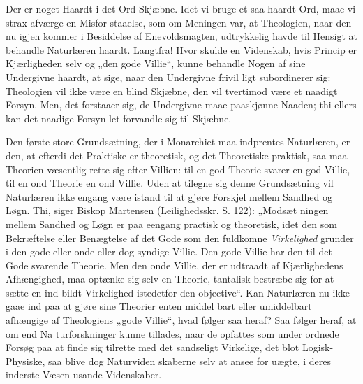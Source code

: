 \documentclass[12pt]{book}
\newcommand{\opage}[1]{\marginnote{\footnotesize\textit{[#1]}}}
\begin{document}
Der er noget Haardt i det Ord Skjæbne. Idet vi
bruge et saa haardt Ord, maae vi strax afværge en Misfor\-%
staaelse, som om Meningen var, at Theologien, naar den nu
igjen kommer i Besiddelse af Enevoldsmagten, udtrykkelig
havde til Hensigt at behandle Naturlæren haardt. Langtfra!
Hvor skulde en Videnskab, hvis Princip er Kjærligheden
selv og „den gode Villie“, kunne behandle Nogen af sine
Undergivne haardt, at sige, naar den Undergivne frivil\-%
ligt subordinerer sig: Theologien vil ikke være en blind
Skjæbne, den vil tvertimod være et naadigt Forsyn. Men,
det forstaaer sig, de Undergivne maae paaskjønne Naaden;
thi ellers kan det naadige Forsyn let forvandle sig til
Skjæbne.

Den første store Grundsætning, der i Monarchiet maa
indprentes Naturlæren, er den, at efterdi det Praktiske er
theoretisk, og det Theoretiske praktisk, saa maa Theorien
væsentlig rette sig efter Villien: til en god Theorie svarer en
god Villie, til en ond Theorie en ond Villie. Uden at tilegne
sig denne Grundsætning vil Naturlæren ikke engang være
istand til at gjøre Forskjel mellem Sandhed og Løgn. Thi,
siger Biskop Martensen (Leilighedsskr. S. 122): „Modsæt\-%
ningen mellem Sandhed og Løgn er paa eengang practisk og
theoretisk, idet den som Bekræftelse eller Benægtelse af det
Gode som den fuldkomne \emph{Virkelighed} grunder i den gode
eller onde eller dog syndige Villie. Den gode Villie har
den til det Gode svarende Theorie. Men den onde Villie,
der er udtraadt af Kjærlighedens Afhængighed, maa optænke
sig selv en Theorie, tantalisk bestræbe sig for at sætte en ind\-%
bildt Virkelighed istedetfor den objective“. Kan Naturlæren
nu ikke gaae ind paa at gjøre sine Theorier enten middel\-%
bart eller umiddelbart afhængige af Theologiens „gode Villie“,
\opage{10}\setcounter{footnote}{0}%
hvad følger saa heraf? Saa følger heraf, at om end Na\-%
turforskninger kunne tillades, naar de opfattes som under\-%
ordnede Forsøg paa at finde sig tilrette med det sandseligt
Virkelige, det blot Logisk-Physiske, saa blive dog Naturviden\-%
skaberne selv at ansee for uægte, i deres inderste Væsen usande
Videnskaber.
\end{document}

